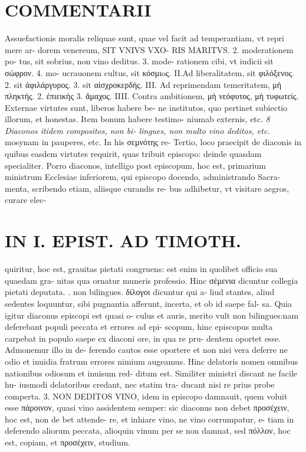 \documentclass{article}
\begin{document}
\begin{pages}
\section*{COMMENTARII }\pstart Assuefactionis moralis reliquae sunt, quae vel facit ad temperantiam, vt repri mere ar- dorem venereum, SIT VNIVS VXO- RIS MARITVS. 2. moderationem po- tus, sit sobrius, non vino deditus. 3. mode- rationem cibi, vt iudicii sit σώφρον. 4. mo- ucrauonem cultus, sit κόσμιoς.  \pend\pstart II.Ad liberalitatem, sit φιλόξενος. 2. sit ἀφιλάργυρος. 3. sit αἰσχροκερδής.  \pend\pstart III. Ad reprimendam temeritatem, μἡ πληκτής. 2. ἐπιεικής 3. ἄμαχος.  \pend\pstart IIII. Contra ambitionem, μὴ νεόφυτος, μὴ τυφωτείς.  \pend\pstart Externae virtutes sunt, liberos habere be- ne institutos, quo pertinet subiectio illorum, et honestas. Item bonum habere testimo- niumab externis, etc.  \pend
\textit{8 Diaconos itidem compositos, non bi- lingues, non multo vino deditos, etc. }\pstart mosynam in pauperes, etc. In his σεμνότης re- Tertio, loco praecipit de diaconis in quibus easdem virtutes requirit, quas tribuit episcopo: deinde quasdam specialiter. Porro diaconos, intelligo post episcopum, hoc est, primarium ministrum Ecclesiae inferiorem, qui episcopo docendo, administrando Sacra- menta, scribendo etiam, aliisque curandis re- bus adhibetur, vt visitare aegros, curare elec-  \pend
\section*{IN I. EPIST. AD TIMOTH. }
\marginpar{[ p.75 ]}\pstart quiritur, hoc est, grauitas pietati congruens: est enim in quolibet officio sua quaedam gra- uitas qua ornatur muneris professio. Hinc σέμενια dicuntur collegia pietati deputata.  \pend{}. non bilingues. δίλογοι dicuntur qui a- liud stantes, aliud sedentes loquuntur, sibi pugnantia afferunt, incerta, et ob id saepe fal- sa. Quia igitur diaconus episcopi est quasi o- culus et auris, merito vult non bilingues:nam deferebant populi peccata et errores ad epi- scopum, hinc episcopus multa carpebat in populo saepe ex diaconi ore, in qua re pru- dentem oportet esse. Admonemur illo in de- ferendo cautos esse oportere et non nisi vera deferre ne odio et inuidia fratrum errores nimium augeamus. Hinc delatoris nomen omnibus nationibus odiosum et inuisum red- ditum est.  \pend\pstart Similiter ministri discant ne facile hu- iusmodi delatoribus credant, nec statim tra- ducant nisi re prius probe comperta. 3. NON DEDITOS VINO, idem in episcopo damnauit, quem voluit esse πάροινον, quasi vino assidentem semper: sic diaconus non debet προσέχειν, hoc est, non de bet attende- re, et inhiare vino, ne vino corrumpatur, e- tiam in deferendo aliorum peccata, alioquin vinum per se non damnat, sed πόλλον, hoc est, copiam, et προσέχειν, studium.  \pend
\marginpar{[ p.72 ]}

\end{pages}
\end{document}
